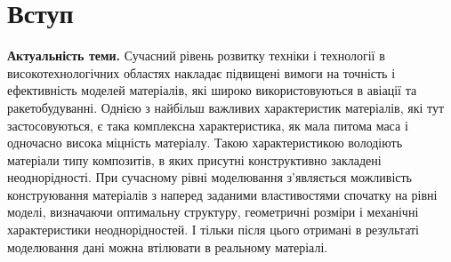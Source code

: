 
\setcounter{secnumdepth}{-1}
\chapter{Вступ}
\setcounter{secnumdepth}{2}


{\bf Актуальність теми.} Сучасний рівень розвитку техніки і технології в високотехнологічних областях накладає підвищені вимоги на точність і ефективність моделей матеріалів, які широко використовуються в авіації та ракетобудуванні. Однією з найбільш важливих характеристик матеріалів, які тут застосовуються, є така комплексна характеристика, як мала питома маса і одночасно висока міцність матеріалу. Такою характеристикою володіють матеріали типу композитів, в яких присутні конструктивно закладені неоднорідності. При сучасному рівні моделювання з'являється можливість конструювання матеріалів з наперед заданими властивостями спочатку на рівні моделі, визначаючи оптимальну структуру, геометричні розміри і механічні характеристики неоднорідностей. І тільки після цього отримані в результаті моделювання дані можна втілювати в реальному матеріалі.

